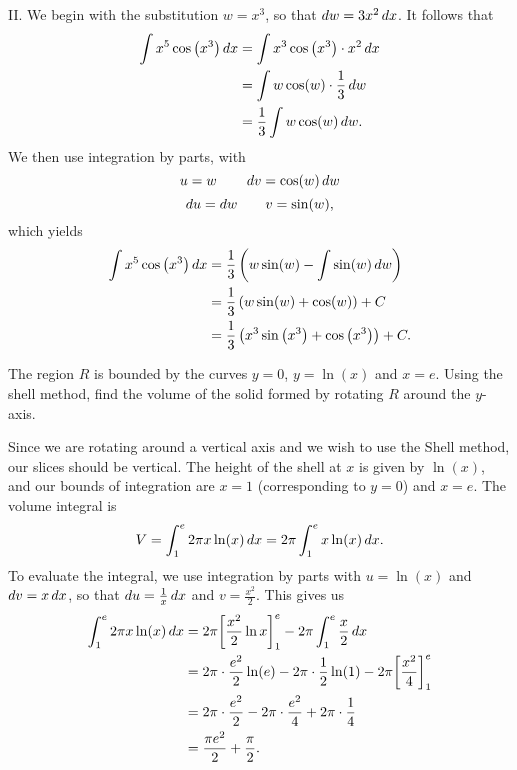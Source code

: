 \documentclass[]{ximera}
\begin{document}
\begin{freeResponse}
		II. We begin with the substitution $w = x^3$, so that $\mathop{}\!d w = 3x^2 \mathop{}\!d x$. It follows that 
		\begin{align*}
		\int x^5 \cos \left( x^3 \right) \mathop{}\!d x 
		&= \int x^3 \cos \left( x^3 \right) \cdot x^2 \mathop{}\!d x  \\
		&= \int w \cos(w) \cdot \frac{1}{3} \mathop{}\!d w  \\
		&= \frac{1}{3} \int w \cos(w) \mathop{}\!d w.
		\end{align*}
	We then use integration by parts, with
		\[
		u = w 		\qquad	\mathop{}\!d v = \cos(w) \mathop{}\!d w
		\]
		\[
		\mathop{}\!d u = \mathop{}\!d w 	\qquad	v = \sin(w),
		\]
	which yields
		\begin{align*}
		\int x^5 \cos \left( x^3 \right) \mathop{}\!d x 
		&= \frac{1}{3} \left( w \sin(w) - \int \sin(w) \mathop{}\!d w \right)  \\
		&= \frac{1}{3} \left( w \sin(w) + \cos(w) \right) + C  \\
		&= \frac{1}{3} \left( x^3 \sin \left( x^3 \right) + \cos \left( x^3 \right) \right) + C.  
		\end{align*}
		
		
\end{freeResponse}

\begin{problem}
The region $R$ is bounded by the curves $y=0$, $y=\ln (x)$ and $x=e$. Using the shell method, find the volume of the solid formed by rotating $R$ around the $y$-axis.
\end{problem}

\begin{freeResponse}
Since we are rotating around a vertical axis and we wish to use the Shell method, our slices should be vertical. The height of the shell at $x$ is given by $\ln (x)$, and our bounds of integration are $x=1$ (corresponding to $y=0$) and $x=e$. The volume integral is 
\[
V=\int_1^e 2 \pi x \ln (x) \mathop{}\!d x = 2 \pi \int_1^e x \ln (x) \mathop{}\!d x.
\]
To evaluate the integral, we use integration by parts with $u = \ln (x)$ and $\mathop{}\!d v = x \mathop{}\!d x$, so that $\mathop{}\!d u = \frac{1}{x} \mathop{}\!d x$ and $v = \frac{x^2}{2}$. This gives us 
\begin{align*}
\int_1^e 2 \pi x \ln (x) \mathop{}\!d x &= 2 \pi \bigg[ \frac{x^2}{2} \ln x \bigg]_1^e - 2 \pi \int_1^e \frac{x}{2} \mathop{}\!d x \\
&= 2 \pi \cdot \frac{e^2}{2}\ln(e) - 2 \pi \cdot \frac{1}{2}\ln (1) - 2 \pi \bigg[ \frac{x^2}{4} \bigg]_1^e \\
&= 2 \pi \cdot \frac{e^2}{2} - 2 \pi \cdot \frac{e^2}{4} + 2 \pi \cdot \frac{1}{4} \\
&= \frac{\pi e^2}{2} + \frac{\pi}{2}.
\end{align*}

\end{freeResponse}
\end{document}
